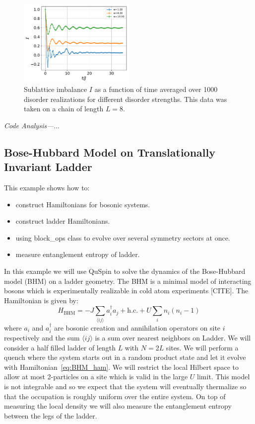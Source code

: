 \documentclass{SciPost}
\newcommand\0{\scalebox{-1}[1]{0}}
\newcommand{\MBLcode}{example9.py}
\begin{document}
\begin{figure}[t!]
	\centering
	\includegraphics[width=0.5\textwidth]{fermion_MBL.pdf}
	\caption{Sublattice imbalance $I$ as a function of time averaged over 1000 disorder realizations for different disorder strengths. This data was taken on a chain of length $L=8$.}
\end{figure}

\noindent\emph{Code Analysis---}...








\subsection{Bose-Hubbard Model on Translationally Invariant Ladder}
\label{subsec:Bose_Ladder}

This example shows how to:
\begin{itemize}
	\item construct Hamiltonians for bosonic systems.
	\item construct ladder Hamiltonians.
	\item using block\_ops class to evolve over several symmetry sectors at once.
	\item measure entanglement entropy of ladder.
\end{itemize}

In this example we will use QuSpin to solve the dynamics of the Bose-Hubbard model (BHM) on a ladder geometry. The BHM is a minimal model of interacting bosons which is experimentally realizable in cold atom experiments [CITE]. The Hamiltonian is given by:
\begin{equation}
	H_\mathrm{BHM} = -J\sum_{\langle ij\rangle} a_i^\dagger a_j + \mathrm{h.c.} + U\sum_{i}n_i(n_i-1)\label{eq:BHM_ham}
\end{equation} 
where $a_i$ and $a^\dagger_i$ are bosonic creation and annihilation operators on site $i$ respectively and the sum $\langle ij\rangle$ is a sum over nearest neighbors on Ladder. We will consider a half filled ladder of length $L$ with $N=2L$ sites. We will perform a quench where the system starts out in a random product state and let it evolve with Hamiltonian~\eqref{eq:BHM_ham}. We will restrict the local Hilbert space to allow at most 2-particles on a site which is valid in the large $U$ limit. This model is not integrable and so we expect that the system will eventually thermalize so that the occupation is roughly uniform over the entire system. On top of measuring the local density we will also measure the entanglement entropy between the legs of the ladder.
\end{document}
